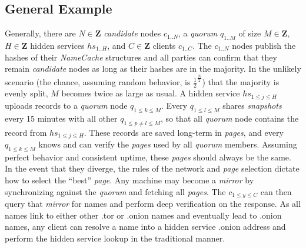 \subsection{General Example}

Generally, there are $ N \in \textbf{Z} $ \emph{candidate} nodes $ c_{1..N} $, a \emph{quorum} $ q_{1..M} $ of size $ M \in \textbf{Z} $, $ H \in \textbf{Z} $ hidden services $ hs_{1..H} $, and $ C \in \textbf{Z} $ clients $ c_{1..C} $. The $ c_{1..N} $ nodes publish the hashes of their \emph{NameCache} structures and all parties can confirm that they remain \emph{candidate} nodes as long as their hashes are in the majority. In the unlikely scenario (the chance, assuming random behavior, is $ \frac{1}{2} ^ {\frac{N}{2}} $) that the majority is evenly split, $ M $ becomes twice as large as usual. A hidden service $ hs_{1 \le j \le H} $ uploads records to a \emph{quorum} node $ q_{1 \le k \le M} $. Every $ q_{1 \le l \le M} $ shares \emph{snapshots} every 15 minutes with all other $ q_{1 \le p \neq l \le M} $, so that all \emph{quorum} node contains the record from $ hs_{1 \le j \le H} $. These records are saved long-term in \emph{pages}, and every $ q_{1 \le k \le M} $ knows and can verify the \emph{pages} used by all \emph{quorum} members. Assuming perfect behavior and consistent uptime, these \emph{pages} should always be the same. In the event that they diverge, the rules of the network and \emph{page} selection dictate how to select the ``best'' \emph{page}. Any machine may become a \emph{mirror} by synchronizing against the \emph{quorum} and fetching all \emph{pages}. The $ c_{1 \le y \le C} $ can then query that \emph{mirror} for names and perform deep verification on the response. As all names link to either other .tor or .onion names and eventually lead to .onion names, any client can resolve a name into a hidden service .onion address and perform the hidden service lookup in the traditional manner.



